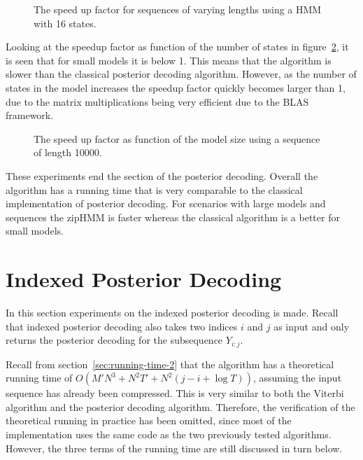 \begin{figure}
  \centering
  
  \caption{The speed up factor for sequences of varying lengths using a HMM
    with 16 states.}
  \label{fig:posterior_speedup_vs_sequence_length}
\end{figure}

Looking at the speedup factor as function of the number of states in
figure~\ref{fig:posterior_speedup_vs_N}, it is seen that for small models it is
below 1. This means that the algorithm is slower than the classical posterior
decoding algorithm. However, as the number of states in the model increases the
speedup factor quickly becomes larger than 1, due to the matrix multiplications
being very efficient due to the BLAS framework.  

\begin{figure}
  \centering
  
  \caption{The speed up factor as function of the model size using a sequence
    of length 10000.}
  \label{fig:posterior_speedup_vs_N}
\end{figure}

These experiments end the section of the posterior decoding. Overall the
algorithm has a running time that is very comparable to the classical
implementation of posterior decoding. For scenarios with large models and
sequences the zipHMM is faster whereas the classical algorithm is a better
for small models.

\section{Indexed Posterior Decoding}

In this section experiments on the indexed posterior decoding is
made. Recall that indexed posterior decoding also takes two indices $i$ and
$j$ as input and only returns the posterior decoding for the subsequence
$Y_{i:j}$.

Recall from section~\ref{sec:running-time-2} that the algorithm has a
theoretical running time of $O(M' N^3 + N^2 T' + N^2 (j - i + \log T))$,
assuming the input sequence has already been compressed. This is very similar
to both the Viterbi algorithm and the posterior decoding algorithm. Therefore,
the verification of the theoretical running in practice has been omitted, since
most of the implementation uses the same code as the two previously tested
algorithms. However, the three terms of the running time are still discussed in
turn below.

